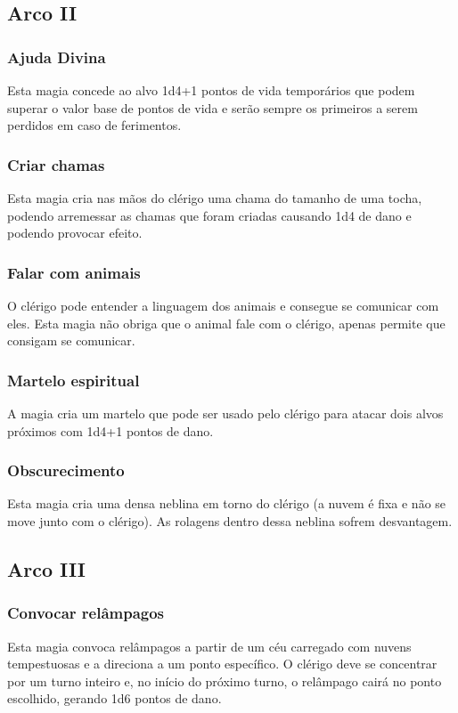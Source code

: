 \documentclass[10pt,twoside,twocolumn]{book}
\begin{document}
\subsection*{Arco II}
\subsubsection*{Ajuda Divina}
Esta magia concede ao alvo 1d4+1 pontos de vida temporários que podem superar o valor base de pontos de vida e serão sempre os primeiros a serem perdidos em caso de ferimentos.
\subsubsection*{Criar chamas}
Esta magia cria nas mãos do clérigo uma chama do tamanho de uma tocha, podendo arremessar as chamas que foram criadas causando 1d4 de dano e podendo provocar efeito. 
\subsubsection*{Falar com animais}
O clérigo pode entender a linguagem dos animais e consegue se comunicar com eles. Esta magia não obriga que
o animal fale com o clérigo, apenas permite que consigam se comunicar.
\subsubsection*{Martelo espiritual}
A magia cria um martelo que pode ser usado pelo clérigo para atacar dois alvos próximos com 1d4+1 pontos de dano. 
\subsubsection*{Obscurecimento}
Esta magia cria uma densa neblina em torno do clérigo (a nuvem é fixa e não se move junto com o clérigo). As rolagens dentro dessa neblina sofrem desvantagem.

\subsection*{Arco III}
\subsubsection*{Convocar relâmpagos}
Esta magia convoca relâmpagos a partir de um céu carregado com nuvens tempestuosas e a direciona a um ponto específico. O clérigo deve se concentrar por um turno inteiro e, no início do próximo turno, o relâmpago cairá no ponto escolhido, gerando 1d6 pontos de dano.
\end{document}
